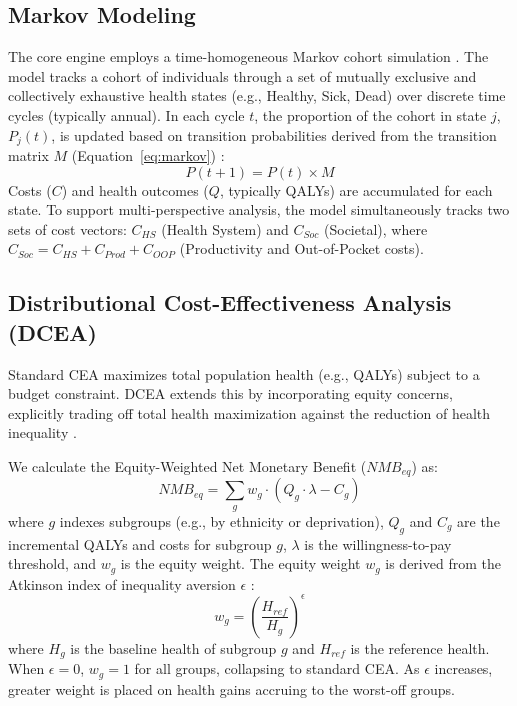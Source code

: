 \documentclass{article}
\begin{document}
\subsection{Markov Modeling}
The core engine employs a time-homogeneous Markov cohort simulation \citep{briggs1998}. The model tracks a cohort of individuals through a set of mutually exclusive and collectively exhaustive health states (e.g., Healthy, Sick, Dead) over discrete time cycles (typically annual).
In each cycle $t$, the proportion of the cohort in state $j$, $P_j(t)$, is updated based on transition probabilities derived from the transition matrix $M$ (Equation~\ref{eq:markov}) \citep{briggs1998}:
\begin{equation} \label{eq:markov}
P(t+1) = P(t) \times M
\end{equation}
Costs ($C$) and health outcomes ($Q$, typically QALYs) are accumulated for each state. To support multi-perspective analysis, the model simultaneously tracks two sets of cost vectors: $C_{HS}$ (Health System) and $C_{Soc}$ (Societal), where $C_{Soc} = C_{HS} + C_{Prod} + C_{OOP}$ (Productivity and Out-of-Pocket costs).

\subsection{Distributional Cost-Effectiveness Analysis (DCEA)}
Standard CEA maximizes total population health (e.g., QALYs) subject to a budget constraint. DCEA extends this by incorporating equity concerns, explicitly trading off total health maximization against the reduction of health inequality \citep{cookson2017}.

We calculate the Equity-Weighted Net Monetary Benefit ($NMB_{eq}$) as:
\begin{equation} \label{eq:nmb_eq}
NMB_{eq} = \sum_{g} w_g \cdot (Q_g \cdot \lambda - C_g)
\end{equation}
where $g$ indexes subgroups (e.g., by ethnicity or deprivation), $Q_g$ and $C_g$ are the incremental QALYs and costs for subgroup $g$, $\lambda$ is the willingness-to-pay threshold, and $w_g$ is the equity weight.
The equity weight $w_g$ is derived from the Atkinson index of inequality aversion $\epsilon$ \citep{atkinson1970}:
\begin{equation} \label{eq:weights}
w_g = \left( \frac{H_{ref}}{H_g} \right)^\epsilon
\end{equation}
where $H_g$ is the baseline health of subgroup $g$ and $H_{ref}$ is the reference health. When $\epsilon=0$, $w_g=1$ for all groups, collapsing to standard CEA. As $\epsilon$ increases, greater weight is placed on health gains accruing to the worst-off groups.
\end{document}
